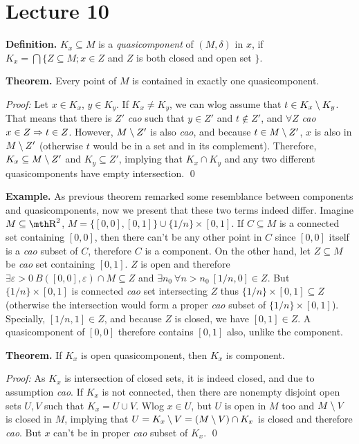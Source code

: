 \chapter{Lecture 10}

{\bf Definition.} $K_x\subseteq M$ is a {\it quasicomponent} of $(M,\delta)$
in $x$, if $K_x=\bigcap \{Z\subseteq M;x\in Z$ and $Z$ is both closed and open set
$\}$.

{\bf Theorem.} Every point of $M$ is contained in exactly one
quasicomponent.

{\it Proof:} Let $x\in K_x$, $y\in K_y$. If $K_x \neq K_y$, we can wlog assume
that $t\in K_x \setminus K_y$. That means that there is $Z'$ {\it cao} such that $y\in Z'$
and $t\notin Z'$, and $\forall Z$ {\it cao} $x\in Z\Rightarrow t\in Z$. However,
$M\setminus Z'$ is also {\it cao}, and because $t\in M\setminus Z'$, $x$ is also in $M\setminus
Z'$ (otherwise $t$ would be in a set and in its complement). Therefore, $K_x
\subseteq M\setminus Z'$ and $K_y\subseteq Z'$, implying that $K_x \cap K_y$ and any
two different quasicomponents have empty intersection.
\qed

{\bf Example.} As previous theorem remarked some resemblance between components
and quasicomponents, now we present that these two terms indeed differ. Imagine
$M\subseteq \R^2$, $M=\{[0,0],[0,1]\}\cup \{1/n\}\times [0,1]$. If $C\subseteq
M$ is a connected set containing $[0,0]$, then there can't be any other point in
$C$ since $[0,0]$ itself is a {\it cao} subset of $C$, therefore $C$ is a
component. On the other hand, let $Z\subseteq M$ be {\it cao} set containing
$[0,1]$. $Z$ is open and therefore $\exists \varepsilon > 0\
B([0,0],\varepsilon) \cap M\subseteq Z$ and $\exists n_0\ \forall n>n_0\ [1/n,0]
\in Z$. But $\{1/n\}\times [0,1]$ is connected {\it cao} set intersecting $Z$
thus $\{1/n\}\times [0,1]\subseteq Z$ (otherwise the intersection would form a
proper {\it cao} subset of $\{1/n\}\times [0,1]$). Specially, $[1/n,1]\in Z$,
and because $Z$ is closed, we have $[0,1] \in Z$. A quasicomponent of $[0,0]$
therefore contains $[0,1]$ also, unlike the component.

{\bf Theorem.} If $K_x$ is open quasicomponent, then $K_x$ is component.

{\it Proof:} As $K_x$ is intersection of closed sets, it is indeed closed, and
due to assumption {\it cao}. If $K_x$ is not connected, then there are nonempty
disjoint open sets $U,V$ such that $K_x = U\cup V$. Wlog $x\in U$, but $U$ is
open in $M$ too and $M\setminus V$ is closed in $M$, implying that $U = K_x \setminus V =
(M\setminus V) \cap K_x$ is closed and therefore {\it cao}. But $x$ can't be in proper
{\it cao} subset of $K_x$.
\qed

